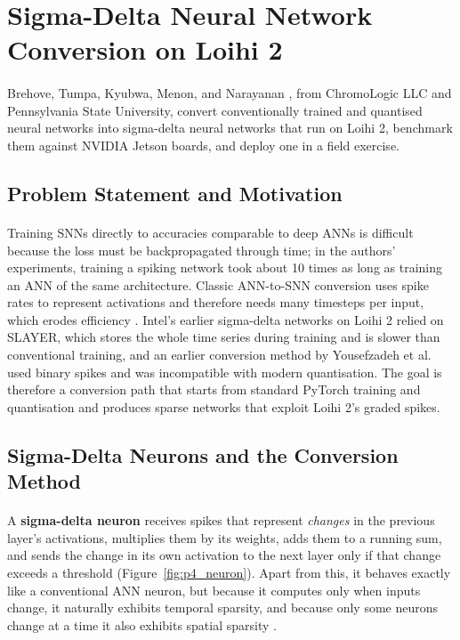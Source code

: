\documentclass[12pt,a4paper,final]{extreport}
\begin{document}
\section{Sigma-Delta Neural Network Conversion on Loihi 2}

\paragraph{} Brehove, Tumpa, Kyubwa, Menon, and Narayanan \cite{p4}, from ChromoLogic LLC and Pennsylvania State University, convert conventionally trained and quantised neural networks into sigma-delta neural networks that run on Loihi 2, benchmark them against NVIDIA Jetson boards, and deploy one in a field exercise.

\subsection{Problem Statement and Motivation}

\paragraph{} Training SNNs directly to accuracies comparable to deep ANNs is difficult because the loss must be backpropagated through time; in the authors' experiments, training a spiking network took about 10 times as long as training an ANN of the same architecture. Classic ANN-to-SNN conversion uses spike rates to represent activations and therefore needs many timesteps per input, which erodes efficiency \cite{p4}. Intel's earlier sigma-delta networks on Loihi 2 relied on SLAYER, which stores the whole time series during training and is slower than conventional training, and an earlier conversion method by Yousefzadeh et al. used binary spikes and was incompatible with modern quantisation. The goal is therefore a conversion path that starts from standard PyTorch training and quantisation and produces sparse networks that exploit Loihi 2's graded spikes.

\subsection{Sigma-Delta Neurons and the Conversion Method}

\paragraph{} A \textbf{sigma-delta neuron} \cite{oconnor2016} receives spikes that represent \emph{changes} in the previous layer's activations, multiplies them by its weights, adds them to a running sum, and sends the change in its own activation to the next layer only if that change exceeds a threshold (Figure~\ref{fig:p4_neuron}). Apart from this, it behaves exactly like a conventional ANN neuron, but because it computes only when inputs change, it naturally exhibits temporal sparsity, and because only some neurons change at a time it also exhibits spatial sparsity \cite{p4}.
\end{document}
